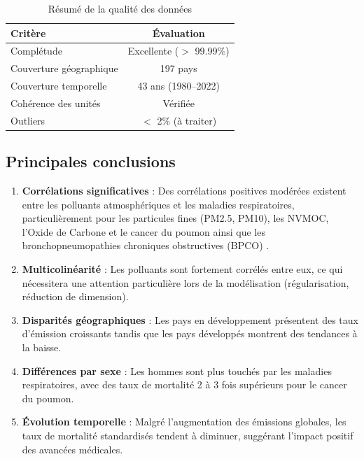 \documentclass[11pt,a4paper]{article}
\begin{document}
\begin{table}[H]
\centering
\caption{Résumé de la qualité des données}
\begin{tabular}{lc}
\toprule
\textbf{Critère} & \textbf{Évaluation} \\
\midrule
Complétude & Excellente ($>$ 99.99\%) \\
Couverture géographique & 197 pays \\
Couverture temporelle & 43 ans (1980--2022) \\
Cohérence des unités & Vérifiée \\
Outliers & $<$ 2\% (à traiter) \\
\bottomrule
\end{tabular}
\end{table}

\subsection{Principales conclusions}

\begin{enumerate}
    \item \textbf{Corrélations significatives} : Des corrélations positives modérées existent entre les polluants atmosphériques et les maladies respiratoires, particulièrement pour les particules fines (PM2.5, PM10), les NVMOC, l'Oxide de Carbone et le cancer du poumon ainsi que les bronchopneumopathies chroniques obstructives (BPCO) .

    \item \textbf{Multicolinéarité} : Les polluants sont fortement corrélés entre eux, ce qui nécessitera une attention particulière lors de la modélisation (régularisation, réduction de dimension).

    \item \textbf{Disparités géographiques} : Les pays en développement présentent des taux d'émission croissants tandis que les pays développés montrent des tendances à la baisse.

    \item \textbf{Différences par sexe} : Les hommes sont plus touchés par les maladies respiratoires, avec des taux de mortalité 2 à 3 fois supérieurs pour le cancer du poumon.

    \item \textbf{Évolution temporelle} : Malgré l'augmentation des émissions globales, les taux de mortalité standardisés tendent à diminuer, suggérant l'impact positif des avancées médicales.
\end{enumerate}
\end{document}
